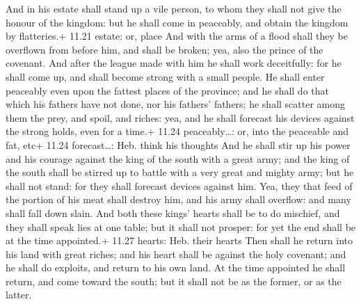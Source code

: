 And in his estate shall stand up a vile person, to whom
they shall not give the honour of the kingdom: but he shall come in
peaceably, and obtain the kingdom by flatteries.+ 11.21 estate: or,
place  And with the arms of a flood shall they be overflown
from before him, and shall be broken; yea, also the prince of the
covenant.  And after the league made with him he shall work
deceitfully: for he shall come up, and shall become strong with a small
people.  He shall enter peaceably even upon the fattest
places of the province; and he shall do that which his fathers have not
done, nor his fathers' fathers; he shall scatter among them the prey,
and spoil, and riches: yea, and he shall forecast his devices against
the strong holds, even for a time.+ 11.24 peaceably\ldots: or, into the
peaceable and fat, etc+ 11.24 forecast\ldots: Heb. think his thoughts
 And he shall stir up his power and his courage against the
king of the south with a great army; and the king of the south shall be
stirred up to battle with a very great and mighty army; but he shall not
stand: for they shall forecast devices against him.  Yea,
they that feed of the portion of his meat shall destroy him, and his
army shall overflow: and many shall fall down slain.  And
both these kings' hearts shall be to do mischief, and they shall speak
lies at one table; but it shall not prosper: for yet the end shall be at
the time appointed.+ 11.27 hearts: Heb. their hearts  Then
shall he return into his land with great riches; and his heart shall be
against the holy covenant; and he shall do exploits, and return to his
own land.  At the time appointed he shall return, and come
toward the south; but it shall not be as the former, or as the latter.

